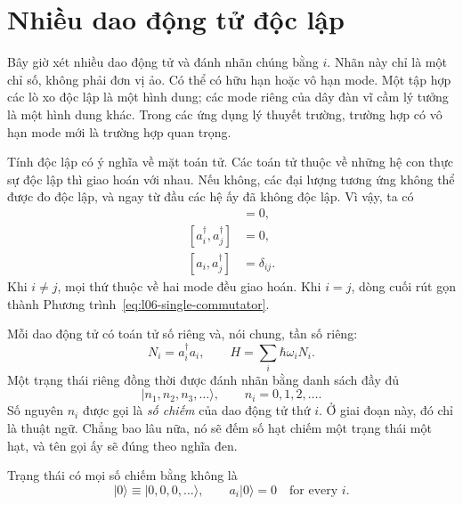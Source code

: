 \section{Nhiều dao động tử độc lập}

Bây giờ xét nhiều dao động tử và đánh nhãn chúng bằng \(i\). Nhãn này chỉ là một chỉ số, không phải đơn vị ảo. Có thể có hữu hạn hoặc vô hạn mode. Một tập hợp các lò xo độc lập là một hình dung; các mode riêng của dây đàn vĩ cầm lý tưởng là một hình dung khác. Trong các ứng dụng lý thuyết trường, trường hợp có vô hạn mode mới là trường hợp quan trọng.

Tính độc lập có ý nghĩa về mặt toán tử. Các toán tử thuộc về những hệ con thực sự độc lập thì giao hoán với nhau. Nếu không, các đại lượng tương ứng không thể được đo độc lập, và ngay từ đầu các hệ ấy đã không độc lập. Vì vậy, ta có
\begin{align}
[a_i,a_j]&=0, \\
[a_i^\dagger,a_j^\dagger]&=0, \\
[a_i,a_j^\dagger]&=\delta_{ij}.
\label{eq:l06-many-commutators}
\end{align}
Khi \(i\ne j\), mọi thứ thuộc về hai mode đều giao hoán. Khi \(i=j\), dòng cuối rút gọn thành Phương trình~\eqref{eq:l06-single-commutator}.

Mỗi dao động tử có toán tử số riêng và, nói chung, tần số riêng:
\begin{equation}
N_i=a_i^\dagger a_i,
\qquad
H=\sum_i\hbar\omega_i N_i.
\label{eq:l06-many-hamiltonian}
\end{equation}
Một trạng thái riêng đồng thời được đánh nhãn bằng danh sách đầy đủ
\begin{equation}
|n_1,n_2,n_3,\ldots\rangle,
\qquad n_i=0,1,2,\ldots.
\label{eq:l06-occupation-ket}
\end{equation}
Số nguyên \(n_i\) được gọi là \emph{số chiếm} của dao động tử thứ \(i\). Ở giai đoạn này, đó chỉ là thuật ngữ. Chẳng bao lâu nữa, nó sẽ đếm số hạt chiếm một trạng thái một hạt, và tên gọi ấy sẽ đúng theo nghĩa đen.

Trạng thái có mọi số chiếm bằng không là
\begin{equation}
|0\rangle\equiv|0,0,0,\ldots\rangle,
\qquad a_i|0\rangle=0\quad\text{for every }i.
\label{eq:l06-oscillator-vacuum}
\end{equation}

\begin{classroomqa}\end{classroomqa}

